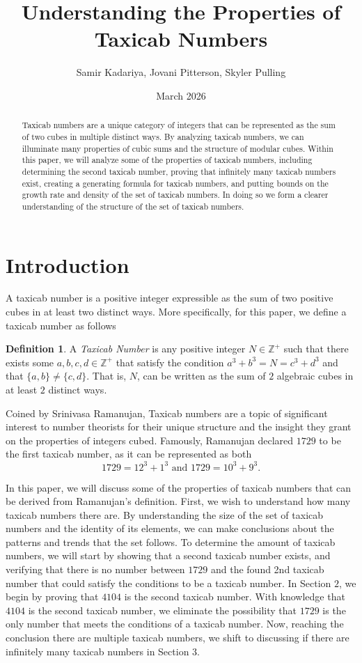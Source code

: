 \documentclass[12pt]{amsart}
\title{Understanding the Properties of Taxicab Numbers}
\author{Samir Kadariya, Jovani Pitterson, Skyler Pulling}
\date{March 2026}
\theoremstyle{definition}
\newtheorem{definition}{Definition}
\theoremstyle{remark}
\begin{document}
\maketitle

\begin{abstract}
    Taxicab numbers are a unique category of integers that can be represented as the sum of two cubes in multiple distinct ways. By analyzing taxicab numbers, we can illuminate many properties of cubic sums and the structure of modular cubes. Within this paper, we will analyze some of the properties of taxicab numbers, including determining the second taxicab number, proving that infinitely many taxicab numbers exist, creating a generating formula for taxicab numbers, and putting bounds on the growth rate and density of the set of taxicab numbers. In doing so we form a clearer understanding of the structure of the set of taxicab numbers.
\end{abstract}

\section{Introduction}
A taxicab number is a positive integer expressible as the sum of two positive cubes in at least two distinct ways. More specifically, for this paper, we define a taxicab number as follows
\begin{definition} 
    A \textit{Taxicab Number} is any positive integer $N \in \mathbb{Z^+} $ such that there exists some $a,b,c,d \in \mathbb{Z^+}$ that satisfy the condition $a^3+b^3=N=c^3+d^3$ and that $\{a,b\} \neq \{c,d\}$. That is, $N$, can be written as the sum of $2$ algebraic cubes in at least $2$ distinct ways.
\end{definition} 
Coined by Srinivasa Ramanujan, Taxicab numbers are a topic of significant interest to number theorists for their unique structure and the insight they grant on the properties of integers cubed. Famously, Ramanujan declared $1729$ to be the first taxicab number, as it can be represented as both 
\[ 1729 = 12^3 +1^3 \text{  and   } 1729=10^3+9^3.\]

In this paper, we will discuss some of the properties of taxicab numbers that can be derived from Ramanujan's definition. First, we wish to understand how many taxicab numbers there are. By understanding the size of the set of taxicab numbers and the identity of its elements, we can make conclusions about the patterns and trends that the set follows. To determine the amount of taxicab numbers, we will start by showing that a second taxicab number exists, and verifying that there is no number between $1729$ and the found 2nd taxicab number that could satisfy the conditions to be a taxicab number. In Section $2$, we begin by proving that $4104$ is the second taxicab number. With knowledge that $4104$ is the second taxicab number, we eliminate the possibility that $1729$ is the only number that meets the conditions of a taxicab number. Now, reaching the conclusion there are multiple taxicab numbers, we shift to discussing if there are infinitely many taxicab numbers in Section $3$. \\
\end{document}
